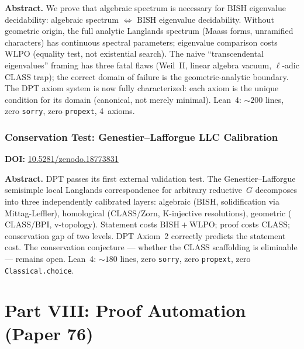\documentclass[11pt,a4paper]{article}
\begin{document}
\bigskip
\noindent\textbf{Abstract.}
We prove that algebraic spectrum is necessary for $\mathrm{BISH}$ eigenvalue decidability: algebraic spectrum $\Leftrightarrow$ $\mathrm{BISH}$ eigenvalue decidability. Without geometric origin, the full analytic Langlands spectrum (Maass forms, unramified characters) has continuous spectral parameters; eigenvalue comparison costs $\mathrm{WLPO}$ (equality test, not existential search). The naive ``transcendental eigenvalues'' framing has three fatal flaws (Weil~II, linear algebra vacuum, $\ell$-adic $\mathrm{CLASS}$ trap); the correct domain of failure is the geometric-analytic boundary. The DPT axiom system is now fully characterized: each axiom is the unique condition for its domain (canonical, not merely minimal). Lean~4: ${\sim}200$ lines, zero \texttt{sorry}, zero \texttt{propext}, 4~axioms.

\section{Conservation Test: Genestier--Lafforgue LLC Calibration}
\label{sec:p75}
\textbf{DOI:} \href{https://doi.org/10.5281/zenodo.18773831}{10.5281/zenodo.18773831}

\bigskip
\noindent\textbf{Abstract.}
DPT passes its first external validation test. The Genestier--Lafforgue semisimple local Langlands correspondence for arbitrary reductive~$G$ decomposes into three independently calibrated layers: algebraic ($\mathrm{BISH}$, solidification via Mittag-Leffler), homological ($\mathrm{CLASS}$/Zorn, K-injective resolutions), geometric ($\mathrm{CLASS}$/BPI, v-topology). Statement costs $\mathrm{BISH}+\mathrm{WLPO}$; proof costs $\mathrm{CLASS}$; conservation gap of two levels. DPT Axiom~2 correctly predicts the statement cost. The conservation conjecture --- whether the $\mathrm{CLASS}$ scaffolding is eliminable --- remains open. Lean~4: ${\sim}180$ lines, zero \texttt{sorry}, zero \texttt{propext}, zero \texttt{Classical.choice}.

\newpage
\part*{Part VIII: Proof Automation (Paper 76)}

\end{document}
